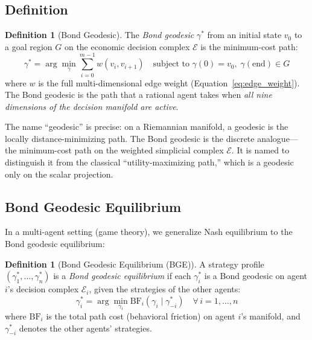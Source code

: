 \documentclass[12pt]{article}
\theoremstyle{definition}
\newtheorem{definition}[theorem]{Definition}
\theoremstyle{remark}
\newcommand{\E}{\mathcal{E}}               %
\newcommand{\BF}{\mathrm{BF}}              %
\begin{document}
\subsection{Definition}

\begin{definition}[Bond Geodesic]
\label{def:geodesic}
The \emph{Bond geodesic} $\gamma^*$ from an initial state $v_0$ to a goal region $G$ on the economic decision complex $\E$ is the minimum-cost path:
\begin{equation}
\gamma^* = \arg\min_\gamma \sum_{i=0}^{m-1} w(v_i, v_{i+1}) \quad \text{subject to } \gamma(0) = v_0,\; \gamma(\text{end}) \in G
\label{eq:geodesic}
\end{equation}
where $w$ is the full multi-dimensional edge weight (Equation~\ref{eq:edge_weight}).  The Bond geodesic is the path that a rational agent takes when \emph{all nine dimensions of the decision manifold are active}.
\end{definition}

The name ``geodesic'' is precise: on a Riemannian manifold, a geodesic is the locally distance-minimizing path.  The Bond geodesic is the discrete analogue---the minimum-cost path on the weighted simplicial complex $\E$.  It is named to distinguish it from the classical ``utility-maximizing path,'' which is a geodesic only on the scalar projection.

\subsection{Bond Geodesic Equilibrium}

In a multi-agent setting (game theory), we generalize Nash equilibrium to the Bond geodesic equilibrium:

\begin{definition}[Bond Geodesic Equilibrium (BGE)]
\label{def:bge}
A strategy profile $(\gamma_1^*, \ldots, \gamma_n^*)$ is a \emph{Bond geodesic equilibrium} if each $\gamma_i^*$ is a Bond geodesic on agent $i$'s decision complex $\E_i$, given the strategies of the other agents:
\begin{equation}
\gamma_i^* = \arg\min_{\gamma_i} \BF_i(\gamma_i \mid \gamma_{-i}^*) \quad \forall\, i = 1, \ldots, n
\label{eq:bge}
\end{equation}
where $\BF_i$ is the total path cost (behavioral friction) on agent $i$'s manifold, and $\gamma_{-i}^*$ denotes the other agents' strategies.
\end{definition}
\end{document}
